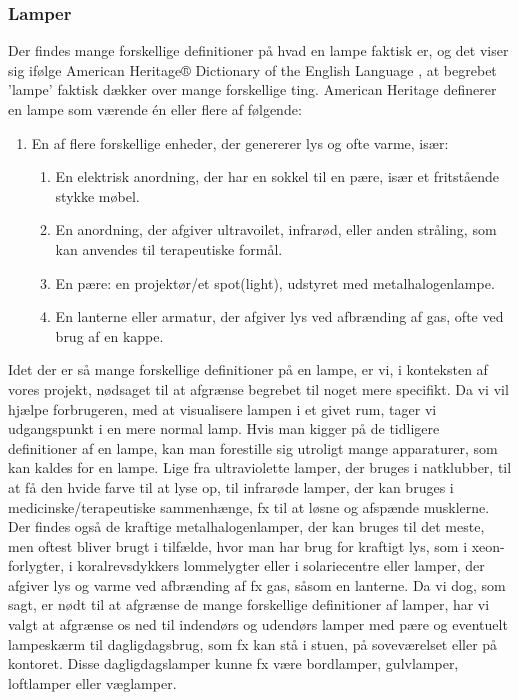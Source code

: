 \subsubsection{Lamper}
Der findes mange forskellige definitioner på hvad en lampe faktisk er, og det viser sig ifølge American Heritage® Dictionary of the English Language \cite{american_heritage}, at begrebet ’lampe’ faktisk dækker over mange forskellige ting. American Heritage definerer en lampe som værende én eller flere af følgende:
\begin{enumerate}
    \item En af flere forskellige enheder, der genererer lys og ofte varme, især:
    \begin{enumerate}
        \item En elektrisk anordning, der har en sokkel til en pære, især et fritstående stykke møbel.
        \item En anordning, der afgiver ultravoilet, infrarød, eller anden stråling, som kan anvendes til terapeutiske formål.
        \item En pære: en projektør/et spot(light), udstyret med metalhalogenlampe.
        \item En lanterne eller armatur, der afgiver lys ved afbrænding af gas, ofte ved brug af en kappe.
    \end{enumerate}
\end{enumerate}
Idet der er så mange forskellige definitioner på en lampe, er vi, i konteksten af vores projekt, nødsaget til at afgrænse begrebet til noget mere specifikt. Da vi vil hjælpe forbrugeren, med at visualisere lampen i et givet rum, tager vi udgangspunkt i en mere normal lamp. Hvis man kigger på de tidligere definitioner af en lampe, kan man forestille sig utroligt mange apparaturer, som kan kaldes for en lampe. Lige fra ultraviolette lamper, der bruges i natklubber, til at få den hvide farve til at lyse op, til infrarøde lamper, der kan bruges i medicinske/terapeutiske sammenhænge, fx til at løsne og afspænde musklerne. Der findes også de kraftige metalhalogenlamper, der kan bruges til det meste, men oftest bliver brugt i tilfælde, hvor man har brug for kraftigt lys, som i xeon-forlygter, i koralrevsdykkers lommelygter eller i solariecentre \cite{metal_lamper} eller lamper, der afgiver lys og varme ved afbrænding af fx gas, såsom en lanterne. Da vi dog, som sagt, er nødt til at afgrænse de mange forskellige definitioner af lamper, har vi valgt at afgrænse os ned til indendørs og udendørs lamper med pære og eventuelt lampeskærm til dagligdagsbrug, som fx kan stå i stuen, på soveværelset eller på kontoret. Disse dagligdagslamper kunne fx være bordlamper, gulvlamper, loftlamper eller væglamper. 

